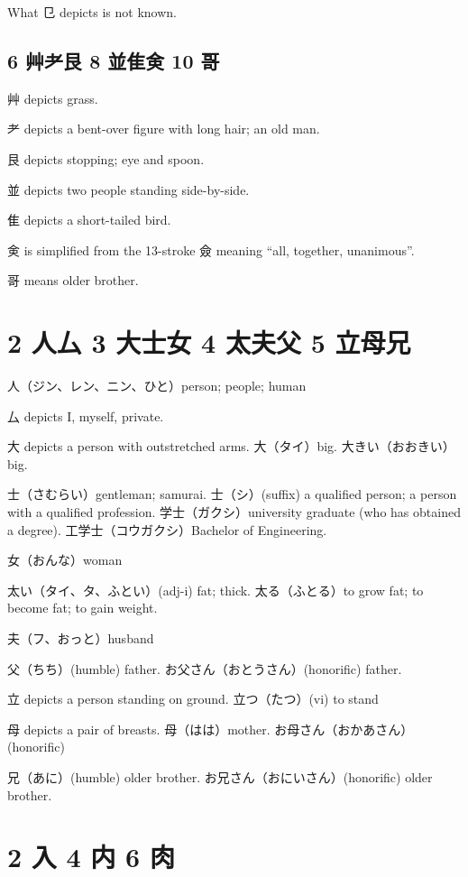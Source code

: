What 㔾 depicts is not known.

\subsection{6 艸耂艮 8 並隹㑒 10 哥}

艸 depicts grass.

耂 depicts a bent-over figure with long hair; an old man.

艮 depicts stopping; eye and spoon.

並 depicts two people standing side-by-side.

隹 depicts a short-tailed bird.

㑒 is simplified from the 13-stroke 僉
meaning ``all, together, unanimous''.

哥 means older brother.

\section{2 人厶 3 大士女 4 太夫父 5 立母兄}

人（ジン、レン、ニン、ひと）person; people; human

厶 depicts I, myself, private.

大 depicts a person with outstretched arms.
大（タイ）big.
大きい（おおきい）big.

士（さむらい）gentleman; samurai.
士（シ）(suffix)
a qualified person;
a person with a qualified profession.
学士（ガクシ）university graduate (who has obtained a degree).
工学士（コウガクシ）Bachelor of Engineering.

女（おんな）woman

太い（タイ、タ、ふとい）(adj-i) fat; thick.
太る（ふとる）to grow fat; to become fat; to gain weight.

夫（フ、おっと）husband

父（ちち）(humble) father.
お父さん（おとうさん）(honorific) father.

立 depicts a person standing on ground.
立つ（たつ）(vi) to stand

母 depicts a pair of breasts.
母（はは）mother.
お母さん（おかあさん）(honorific)

兄（あに）(humble) older brother.
お兄さん（おにいさん）(honorific) older brother.

\section{2 入 4 内 6 肉}


